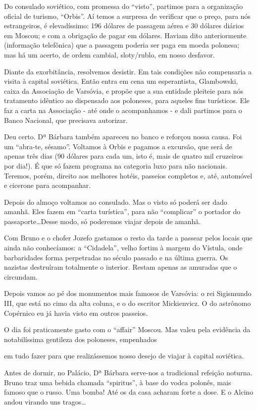 Do consulado soviético, com promessa do “visto”, partimos para a organização oficial de turismo, “Orbis”. Aí temos a surpresa de verificar que o preço, para nós estrangeiros, é elevadíssimo: 196 dólares de passagem aérea e 30 dólares diários em Moscou; e com a obrigação de pagar em dólares. Haviam dito anteriormente (informação telefônica) que a passagem poderia ser paga em moeda polonesa; mas há um acerto, de ordem cambial, sloty/rublo, em nosso desfavor.

Diante da exorbitância, resolvemos desistir. Em tais condições não compensaria a visita à capital soviética. Então entra em cena um esperantista, Glambowski, caixa da Associação de Varsóvia, e propõe que a sua entidade pleiteie para nós tratamento idêntico ao dispensado aos poloneses, para aqueles fins turísticos. Ele faz a carta na Associação - até onde o acompanhamos - e dali partimos para o Banco Nacional, que precisava autorizar.

Deu certo. Dª Bárbara também apareceu no banco e reforçou nossa causa. Foi um “abra-te, sésamo”. Voltamos à Orbis e pagamos a excursão, que será de apenas três dias (90 dólares para cada um, isto é, mais de quatro mil cruzeiros por dia!). É que só fazem programa na categoria luxo para não nacionais. Teremos, porém, direito aos melhores hotéis, passeios completos e, até, automóvel e cicerone para acompanhar.

Depois do almoço voltamos ao consulado. Mas o visto só poderá ser dado amanhã. Eles fazem em “carta turística”, para não “complicar” o portador do passaporte\ldots Desse modo, só poderemos viajar depois de amanhã.

Com Bruno e o chofer Jozefo gastamos o resto da tarde a passear pelos locais que ainda não conhecíamos: a “Cidadela”, velho fortim à margem do Vístula, onde barbaridades forma perpetradas no século passado e na última guerra. Os nazistas destruíram totalmente o interior. Restam apenas as amuradas que o circundam.

Depois vamos ao pé dos monumentos mais famosos de Varsóvia: o rei Sigismundo III, que está no cimo da alta coluna, e o do escritor Mickienvicz. O do astrônomo Copérnico eu já havia visto em outros passeios.

O dia foi praticamente gasto com o “affair” Moscou. Mas valeu pela evidência da notabilíssima gentileza dos poloneses, empenhados

em tudo fazer para que realizássemos nosso desejo de viajar à capital soviética.

Antes de dormir, no Palácio, Dª Bárbara serve-nos a tradicional refeição noturna. Bruno traz uma bebida chamada “spiritus”, à base do vodca polonês, mais famoso que o russo. Uma bomba! Até os da casa acharam forte a dose. E o Alcino andou virando uns tragos\ldots

